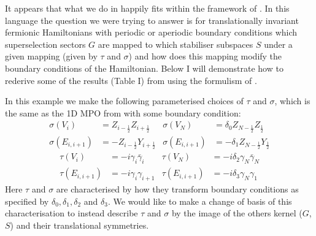 \documentclass{article}
\begin{document}
It appears that what we do in \cite{PhysRevB.111.115126} happily fits within the framework of \cite{chien2022optimizingfermionicencodingshamiltonian}. In this language the question we were trying to answer is for translationally invariant fermionic Hamiltonians with periodic or aperiodic boundary conditions which superselection sectors $G$ are mapped to which stabiliser subspaces $S$ under a given mapping (given by $\tau$ and $\sigma$) and how does this mapping modify the boundary conditions of the Hamiltonian. Below I will demonstrate how to rederive some of the results (Table I) from \cite{PhysRevB.111.115126} using the formulism of \cite{chien2022optimizingfermionicencodingshamiltonian}. 

In this example we make the following parameterised choices of $\tau$ and $\sigma$, which is the same as the 1D MPO from \cite{PhysRevB.111.115126} with some boundary condition:
\begin{align}
    \sigma(V_i) &= Z_{i-\frac{1}{2}}Z_{i+\frac{1}{2}}&\sigma(V_N) &= \delta_0 Z_{N-\frac{1}{2}}Z_{\frac{1}{2}}\\
    \sigma(E_{i,i+1}) &= -Z_{i-\frac{1}{2}}Y_{i+\frac{1}{2}} &\sigma(E_{i,i+1}) &= -\delta_1 Z_{N-\frac{1}{2}}Y_{\frac{1}{2}}
\end{align}
\begin{align}
    \tau(V_i) &= -i\gamma_i\bar{\gamma}_i&\tau(V_N) &= -i\delta_2 \gamma_N\bar{\gamma}_N\\
    \tau(E_{i,i+1}) &= -i\gamma_i\gamma_{i+1} &\tau(E_{i,i+1}) &= -i\delta_3 \gamma_N\gamma_{1}
\end{align}
Here $\tau$ and $\sigma$ are characterised by how they transform boundary conditions as specified by $\delta_0, \delta_1, \delta_2$ and $\delta_3$. We would like to make a change of basis of this characterisation to instead describe $\tau$ and $\sigma$ by the image of the others kernel ($G$, $S$) and their translational symmetries.
\end{document}
